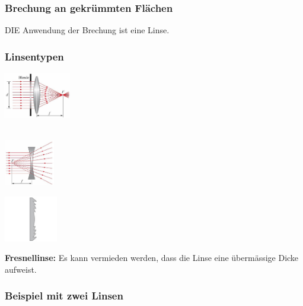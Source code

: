 \subsubsection{Brechung an gekrümmten Flächen}

DIE Anwendung der Brechung ist eine Linse.


\subsubsection{Linsentypen}

\begin{minipage}{0.3\linewidth}
\includegraphics[height=2.0cm]{Bilder/Wellen-Optik/sammellinse} \\
 \\
\end{minipage}
\hfill
\begin{minipage}{0.3\linewidth}
\includegraphics[height=2.0cm]{Bilder/Wellen-Optik/zerstreuungslinse}
 \\
\end{minipage}
\hfill
\begin{minipage}{0.3\linewidth}
\includegraphics[height=2.0cm]{Bilder/Wellen-Optik/fresnellinse}
 \\
\end{minipage}

\vspace{0.2cm}

\textbf{Fresnellinse:} Es kann vermieden werden, dass die Linse eine übermässige Dicke aufweist. 



\subsubsection{Beispiel mit zwei Linsen}

